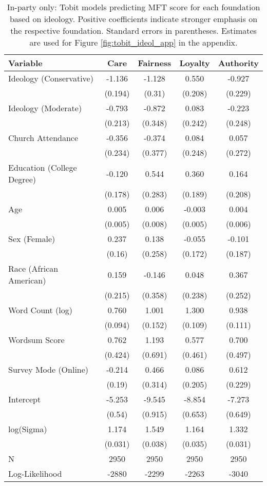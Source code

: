 \begin{table}[ht]
\centering
\caption{In-party only: Tobit models predicting MFT score for each foundation based 
           on ideology. Positive coefficients indicate stronger emphasis on the respective 
           foundation. Standard errors in parentheses. Estimates are used for 
           Figure \ref{fig:tobit_ideol_app} in the appendix.} 
\label{tab:tobit_in}
\begingroup\footnotesize
\begin{tabular}{lcccc}
  \hline
Variable & Care & Fairness & Loyalty & Authority \\ 
  \hline
Ideology (Conservative) & -1.136 & -1.128 &  0.550 & -0.927 \\ 
   & (0.194) & (0.31) & (0.208) & (0.229) \\ 
  Ideology (Moderate) & -0.793 & -0.872 &  0.083 & -0.223 \\ 
   & (0.213) & (0.348) & (0.242) & (0.248) \\ 
  Church Attendance & -0.356 & -0.374 &  0.084 &  0.057 \\ 
   & (0.234) & (0.377) & (0.248) & (0.272) \\ 
  Education (College Degree) & -0.120 &  0.544 &  0.360 &  0.164 \\ 
   & (0.178) & (0.283) & (0.189) & (0.208) \\ 
  Age &  0.005 &  0.006 & -0.003 &  0.004 \\ 
   & (0.005) & (0.008) & (0.005) & (0.006) \\ 
  Sex (Female) &  0.237 &  0.138 & -0.055 & -0.101 \\ 
   & (0.16) & (0.258) & (0.172) & (0.187) \\ 
  Race (African American) &  0.159 & -0.146 &  0.048 &  0.367 \\ 
   & (0.215) & (0.358) & (0.238) & (0.252) \\ 
  Word Count (log) &  0.760 &  1.001 &  1.300 &  0.938 \\ 
   & (0.094) & (0.152) & (0.109) & (0.111) \\ 
  Wordsum Score &  0.762 &  1.193 &  0.577 &  0.700 \\ 
   & (0.424) & (0.691) & (0.461) & (0.497) \\ 
  Survey Mode (Online) & -0.214 &  0.466 &  0.086 &  0.612 \\ 
   & (0.19) & (0.314) & (0.205) & (0.229) \\ 
  Intercept & -5.253 & -9.545 & -8.854 & -7.273 \\ 
   & (0.54) & (0.915) & (0.653) & (0.649) \\ 
  log(Sigma) &  1.174 &  1.549 &  1.164 &  1.332 \\ 
   & (0.031) & (0.038) & (0.035) & (0.031) \\ 
   \hline
N & 2950 & 2950 & 2950 & 2950 \\ 
  Log-Likelihood & -2880 & -2299 & -2263 & -3040 \\ 
   \hline
\end{tabular}
\endgroup
\end{table}
